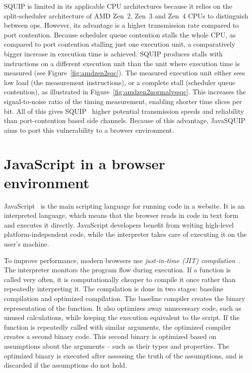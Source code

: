 \documentclass[11pt,
  titlepage=false,
  parskip=half,      %
]{scrreprt}
\begin{document}
SQUIP is limited in its applicable CPU architectures because it relies on the split-scheduler architecture of AMD Zen~2, Zen~3 and Zen~4 CPUs to distinguish between \textmu ops.
However, its advantage is a higher transmission rate compared to port contention.
Because scheduler queue contention stalls the whole CPU, as compared to port contention stalling just one execution unit,
a comparatively bigger increase in execution time is achieved.
SQUIP produces stalls with instructions on a different execution unit than the unit where execution time is measured (see Figure~\ref{fig:amdzen2sqc}).
The measured execution unit either sees low load (the measurement instructions), or a complete stall (scheduler queue contention),
as illustrated in Figure~\ref{fig:amdzen2normalvssqc}.
This increases the signal-to-noise ratio of the timing measurement,
enabling shorter time slices per bit.
All of this gives SQUIP~\cite{squip} higher potential transmission speeds and reliability than port-contention based side channels.
Because of this advantage, JavaSQUIP aims to port this vulnerability to a browser environment.

\section{JavaScript in a browser environment}
\label{sec:javascriptenv}
JavaScript~\cite{javascript} is the main scripting language for running code in a website.
It is an interpreted language, which means that the browser reads in code in text form and executes it directly.
JavaScript developers benefit from writing high-level platform-independent code,
while the interpreter takes care of executing it on the user's machine.

To improve performance, modern browsers use \textit{just-in-time (JIT) compilation}~\cite{jitcompiler}.
The interpreter monitors the program flow during execution.
If a function is called very often,
it is computationally cheaper to compile it once rather than repeatedly interpreting it.
The compilation is done in two stages: baseline compilation and optimized compilation.
The baseline compiler creates the binary representation of the function.
It also optimizes away unnecessary code, such as unused calculations, while keeping the execution equivalent to the script.
If the function is repeatedly called with similar arguments, the optimized compiler creates a second binary code.
This second binary is optimized based on assumptions about the arguments -- such as their types and properties.
The optimized binary is executed after assessing the truth of the assumptions, and is discarded if the assumptions do not hold.
\end{document}
